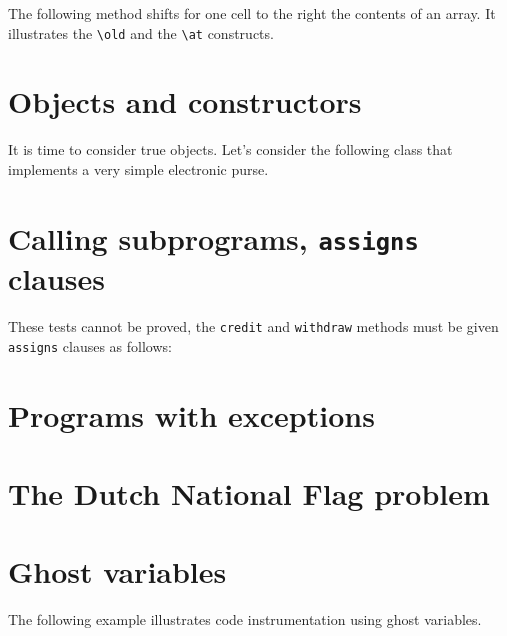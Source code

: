 \documentclass[a4paper,11pt,twoside,openright]{report}
\begin{document}

The following method shifts for one cell to the right the contents of
an array. It illustrates the \verb|\old| and the \verb|\at|
constructs.


\section{Objects and constructors}

It is time to consider true \Java{} objects. Let's consider the
following class that implements a very simple electronic purse.



\section{Calling subprograms, \texttt{assigns} clauses}





These tests cannot be proved, the \texttt{credit} and
\texttt{withdraw} methods must be given \texttt{assigns} clauses as
follows: 


\section{Programs with exceptions}




\section{The Dutch National Flag problem}



\section{Ghost variables}


The following example illustrates code instrumentation using ghost
variables.
\end{document}
